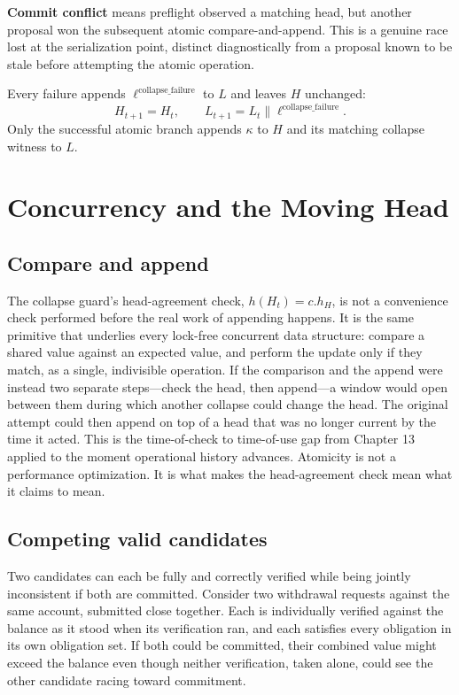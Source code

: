 \documentclass[11pt,openany]{book}
\begin{document}
\textbf{Commit conflict} means preflight observed a matching head, but another
proposal won the subsequent atomic compare-and-append. This is a genuine race
lost at the serialization point, distinct diagnostically from a proposal known
to be stale before attempting the atomic operation.

Every failure appends \(\ell^{\mathrm{collapse\_failure}}\) to \(L\) and
leaves \(H\) unchanged:
\[
 H_{t+1}=H_t,
 \qquad
 L_{t+1}=L_t\mathbin{\|}\ell^{\mathrm{collapse\_failure}}.
\]
Only the successful atomic branch appends \(\kappa\) to \(H\) and its matching
collapse witness to \(L\).

\chapter{Concurrency and the Moving Head}
\section{Compare and append}
The collapse guard's head-agreement check, \(h(H_t)=c.h_H\), is not a
convenience check performed before the real work of appending happens. It is
the same primitive that underlies every lock-free concurrent data structure:
compare a shared value against an expected value, and perform the update only
if they match, as a single, indivisible operation. If the comparison and the
append were instead two separate steps---check the head, then append---a window
would open between them during which another collapse could change the head.
The original attempt could then append on top of a head that was no longer
current by the time it acted. This is the time-of-check to time-of-use gap from
Chapter 13 applied to the moment operational history advances. Atomicity is
not a performance optimization. It is what makes the head-agreement check mean
what it claims to mean.

\section{Competing valid candidates}
Two candidates can each be fully and correctly verified while being jointly
inconsistent if both are committed. Consider two withdrawal requests against
the same account, submitted close together. Each is individually verified
against the balance as it stood when its verification ran, and each satisfies
every obligation in its own obligation set. If both could be committed, their
combined value might exceed the balance even though neither verification,
taken alone, could see the other candidate racing toward commitment.
\end{document}
